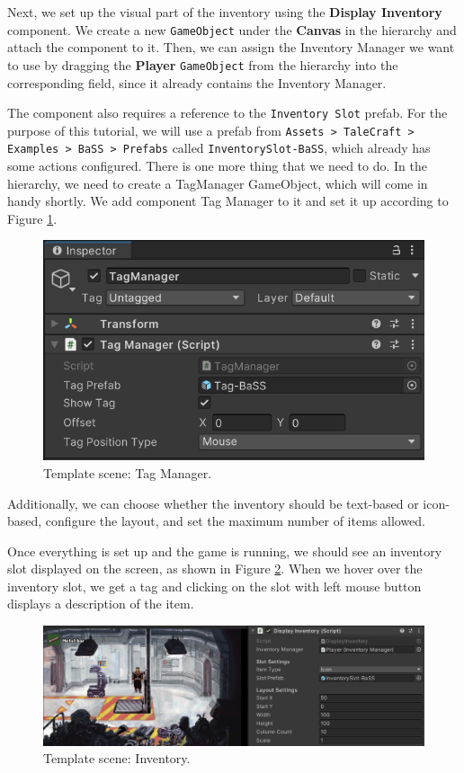 Next, we set up the visual part of the inventory using the \textbf{Display Inventory} component. We create a new \verb|GameObject| under the \textbf{Canvas} in the hierarchy and attach the component to it. Then, we can assign the Inventory Manager we want to use by dragging the \textbf{Player} \verb|GameObject| from the hierarchy into the corresponding field, since it already contains the Inventory Manager.

The component also requires a reference to the \texttt{Inventory Slot} prefab. For the purpose of this tutorial, we will use a prefab from \texttt{Assets > TaleCraft > Examples > BaSS > Prefabs} called \texttt{InventorySlot-BaSS}, which already has some actions configured. There is one more thing that we need to do. In the hierarchy, we need to create a TagManager GameObject, which will come in handy shortly. We add component Tag Manager to it and set it up according to Figure \ref{fig:Tutorial-template:TM}. 

\begin{figure}[H]
\centering
\includegraphics[width=0.6\linewidth]{img/User doc/image_2025-07-09_135233837.png}
\caption{Template scene: Tag Manager.}
\label{fig:Tutorial-template:TM}
\end{figure}

Additionally, we can choose whether the inventory should be text-based or icon-based, configure the layout, and set the maximum number of items allowed.

Once everything is set up and the game is running, we should see an inventory slot displayed on the screen, as shown in Figure \ref{fig:Tutorial-template:Inv}. When we hover over the inventory slot, we get a tag and clicking on the slot with left mouse button displays a description of the item.

\begin{figure}[H]
\centering
\includegraphics[width=1\linewidth]{img/User doc/image_2025-07-09_135900005.png}
\caption{Template scene: Inventory.}
\label{fig:Tutorial-template:Inv}
\end{figure}


